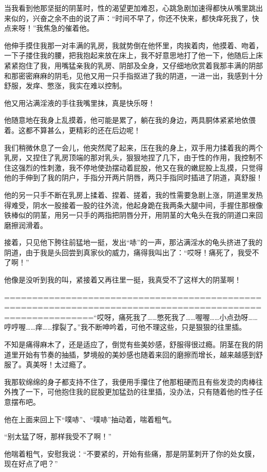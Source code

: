 \documentclass[12pt,UTF8]{ctexbook}
\begin{document}
当我看到他那坚挺的阴茎时，性的渴望更加难忍，心跳急剧加速得都快从嘴里跳出来似的，兴奋之余不由的说了声：“时间不早了，你还不快来，都快痒死我了，快点来呀！”我焦急的催着他。

他伸手摸住我那一对丰满的乳房，我就势倒在他怀里，肉挨着肉，他摸着、吻着，一下子搂住我的腰，把我抱起来放在床上，我不好意思地打了他一下，他随后上床紧紧抱住了我，用嘴猛亲我的乳房、阴部及全身，又仔细地欣赏着我那丰满的阴部和那密密麻麻的阴毛，见他又用一只手指抠进了我的阴道，一进一出，我感到十分舒服，发痒、憋涨，我实在难以控制。

他又用沾满淫液的手往我嘴里抹，真是快乐呀！

他随意地在我身上乱摸着，他可能是累了，躺在我的身边，两具胴体紧紧地依偎着。这都不算甚么，更精彩的还在后边呢！

我们稍微休息了一会儿，他突然爬了起来，压在我的身上，双手用力揉着我的两个乳房，又捏住了乳房顶端的那对乳头，狠狠地捏了几下，由于性的作用，我控制不住这强烈的性刺激，我不停地使劲摆动着屁股，他又在我的嫩屁股上乱摸，只觉得他的手伸到了我的阴户，手指分开两片阴唇，两只手指同时插进了阴道，真舒服！

他的另一只手不断在乳房上揉着、捏着、搓着，我的性需要急剧上涨，阴道里发热得难受，阴水一股接着一股的往外流，他起身跪在我两条大腿中间，手握住那根像铁棒似的阴茎，用另一只手的两指把阴唇分开，用阴茎的大龟头在我的阴道口来回磨擦润滑着。

接着，只见他下胯往前猛地一挺，发出“哧”的一声，那沾满淫水的龟头挤进了我的阴道，由于我是头回尝到真家伙的威力，痛得我叫出了：“哎呀！痛死了，我受不了啊！”

他像是没听到我的叫，紧接着又再往里一挺，我真受不了这样大的阴茎啊！

============================================================================================================“哎呀，痛死我了……憋死我了……喔喔……小点劲呀……哼哼喔……痒……撑裂了。”我不断呻吟着，可他不理这些，只是狠狠的往里插。

不知是痛得麻木了，还是适应了，倒觉有些美妙感，舒服得很过瘾。阴茎在我的阴道里开始有节奏的抽插，梦境般的美妙感也随着来回的磨擦而增长，越来越感到舒服了。真美呀！太过瘾了。

我那软绵绵的身子都支持不住了，我便用手攥住了他那粗硬而且有些发烫的肉棒往外拽了一下，可他抱住我的屁股更加猛劲的往里插，没办法，只有随着他的性子任意摆布吧。

他在上面来回上下“噗哧”、“噗哧”抽动着，喘着粗气。

“别太猛了呀，那样我受不了啊！”

他喘着粗气，安慰我说：“不要紧的，开始有些痛，那是阴茎刺开了你的处女膜，现在好点了吧？”
\end{document}
